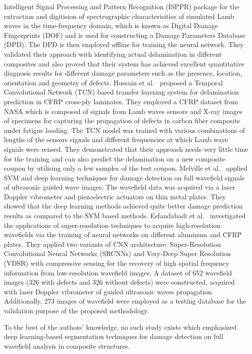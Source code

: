 Intelligent Signal Processing and Pattern Recognition (ISPPR) package for the extraction and digitision of spectrographic characterisitics of simulated Lamb waves in the time-frequency domain, which is known as Digital Damage Fingerprints (DOF) and is used for constructing a Damage Parameters Database (DPD). The DPD is then employed offline for training the neural network. They validated their approach with identifying actual delamination in different composites and also proved that their system has achieved excellent quantitative diagnosis results for different damage parameters such as the presence, location, orientation and geometry of defects. Hussain et al.~\cite{hussaintemporal} proposed a Temporal Convolutional Network (TCN) based transfer learning system for delamination prediction in CFRP cross-ply laminates. They employed a CFRP dataset from NASA which is composed of signals from Lamb waves sensors and X-ray images of specimens for capturing the propagation of defects in carbon fiber composite under fatigue loading. The TCN model was trained with various combinations of lengths of the sensors signals and different frequencies at which Lamb wave signals were sensed. They demonstrated that their approach needs very little time for the training and can also predict the delamination on a new composite coupon by utilising only a few samples of the test coupon. Melville et al.~\cite{melville2018structural} applied SVM and deep learning techniques for damage detection on full wavefield signals of ultrasonic guided wave images. The wavefield data was acquired via a laser Doppler vibrometer and piezoelectric actuators on thin metal plates. They showed that the deep learning methods achieved quite better damage prediction results as compared to the SVM based methods. Esfandabadi et al.~\cite{keshmiri2019deep} investigated the applications of super-resolution techniques to acquire high-resolution wavefields via the training of neural networks on different aluminum and CFRP plates. They applied two variants of CNN architecture: Super-Resolution Convolutional Neural Networks (SRCNNs) and Very-Deep Super Resolution (VDSR) with compressive sensing for the recovery of high spatial frequency information from low-resolution wavefield images. A dataset of 652 wavefield images (326 with defects and 326 without defects) were constructed, acquired with laser Doppler vibrometer of guided ultrasonic waves propagation. Additionally, 273 images of wavefield were employed as a testing database for the validation purpose of the proposed methodology.           

To the best of the authors' knowledge, no such study exists which emphasized deep learning-based segmentation techniques for damage detection on full wavefield analysis in composite structures.